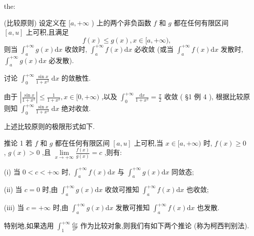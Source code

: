 \begin{theorem}{}{the:}

\end{theorem}
 (比较原则) 设定义在 \(\lbrack a, + \infty\) ) 上的两个非负函数 \(f\) 和 \(g\) 都在任何有限区间 \(\left\lbrack  {a,u}\right\rbrack\) 上可积,且满足
\[
f\left( x\right)  \leq  g\left( x\right) ,x \in  \lbrack a, + \infty ),
\]
则当 \({\int }_{a}^{+\infty }g\left( x\right) \mathrm{d}x\) 收敛时, \({\int }_{a}^{+\infty }f\left( x\right) \mathrm{d}x\) 必收敛 (或当 \({\int }_{a}^{+\infty }f\left( x\right) \mathrm{d}x\) 发散时, \({\int }_{a}^{+\infty }g\left( x\right) \mathrm{d}x\) 必发散).

\begin{example}

\end{example}
讨论 \({\int }_{0}^{+\infty }\frac{\sin x}{1 + {x}^{2}}\mathrm{\;d}x\) 的敛散性.

\begin{solution}

\end{solution}
由于 \(\left| \frac{\sin x}{1 + {x}^{2}}\right|  \leq  \frac{1}{1 + {x}^{2}},x \in  \lbrack 0, + \infty )\) ,以及 \({\int }_{0}^{+\infty }\frac{\mathrm{d}x}{1 + {x}^{2}} = \frac{\pi }{2}\) 收敛 ( §1 例 4 ), 根据比较原则知 \({\int }_{0}^{+\infty }\frac{\sin x}{1 + {x}^{2}}\mathrm{\;d}x\) 绝对收敛.

上述比较原则的极限形式如下.

推论 1 若 \(f\) 和 \(g\) 都在任何有限区间 \(\left\lbrack  {a,u}\right\rbrack\) 上可积,当 \(x \in  \lbrack a, + \infty )\) 时, \(f\left( x\right)  \geq  0\) , \(g\left( x\right)  > 0\) ,且 \(\mathop{\lim }\limits_{{x \rightarrow   + \infty }}\frac{f\left( x\right) }{g\left( x\right) } = c\) ,则有:

(i) 当 \(0 < c <  + \infty\) 时, \({\int }_{a}^{+\infty }f\left( x\right) \mathrm{d}x\) 与 \({\int }_{a}^{+\infty }g\left( x\right) \mathrm{d}x\) 同敛态;

(ii) 当 \(c = 0\) 时,由 \({\int }_{a}^{+\infty }g\left( x\right) \mathrm{d}x\) 收敛可推知 \({\int }_{a}^{+\infty }f\left( x\right) \mathrm{d}x\) 也收敛;

(iii) 当 \(c =  + \infty\) 时,由 \({\int }_{a}^{+\infty }g\left( x\right) \mathrm{d}x\) 发散可推知 \({\int }_{a}^{+\infty }f\left( x\right) \mathrm{d}x\) 也发散.

特别地,如果选用 \({\int }_{1}^{+\infty }\frac{\mathrm{d}x}{{x}^{p}}\) 作为比较对象,则我们有如下两个推论 (称为柯西判别法).


